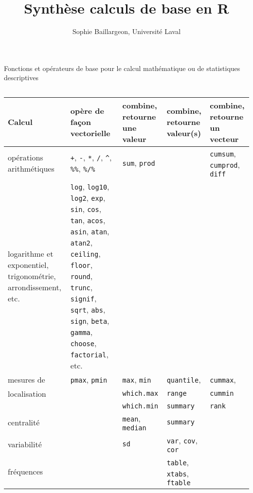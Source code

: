 \documentclass[ignorenonframetext,]{beamer}
\title{Synthèse calculs de base en R}
\author{Sophie Baillargeon, Université Laval}
\begin{document}
\begin{frame}{Fonctions et opérateurs de base pour le calcul mathématique ou de statistiques descriptives}

\begin{columns}
\column{\dimexpr\paperwidth-25pt}
\begin{scriptsize}
\begin{tabular}{L{6em}|L{11em}L{5em}L{6em}L{4.5em}} \hline
Calcul & opère de façon vectorielle & combine, retourne une valeur & combine, retourne valeur(s) & combine, retourne un vecteur \\ \hline \hline

opérations arithmétiques & \texttt{+}, \texttt{-}, \texttt{*}, \texttt{/}, \texttt{\^{}}, \texttt{\%\%}, \texttt{\%/\%} & \texttt{sum}, \texttt{prod} & & \texttt{cumsum},  \texttt{cumprod}, \texttt{diff} \\ \hline

logarithme et exponentiel, trigonométrie, arrondissement, etc. & \texttt{log}, \texttt{log10}, \texttt{log2}, \texttt{exp}, \texttt{sin}, \texttt{cos}, \texttt{tan}, \texttt{acos}, \texttt{asin}, \texttt{atan}, \texttt{atan2}, \texttt{ceiling}, \texttt{floor},  \texttt{round}, \texttt{trunc}, \texttt{signif}, \texttt{sqrt}, \texttt{abs}, \texttt{sign}, \texttt{beta}, \texttt{gamma}, \texttt{choose}, \texttt{factorial}, etc. & & & \\ \hline \hline
	
mesures de & \texttt{pmax}, \texttt{pmin} & \texttt{max}, \texttt{min} & \texttt{quantile},  & \texttt{cummax}, \\
localisation & & \texttt{which.max} & \texttt{range} & \texttt{cummin} \\ 
 & & \texttt{which.min} & \texttt{summary} & \texttt{rank} \\ \hline
centralité & & \texttt{mean}, \texttt{median} & \texttt{summary} & \\ \hline
variabilité & & \texttt{sd} & \texttt{var}, \texttt{cov}, \texttt{cor} & \\ \hline
fréquences & & &  \texttt{table}, \texttt{xtabs}, \texttt{ftable} & \\ \hline

\end{tabular}
\end{scriptsize}
\end{columns}

\end{frame}
\end{document}

